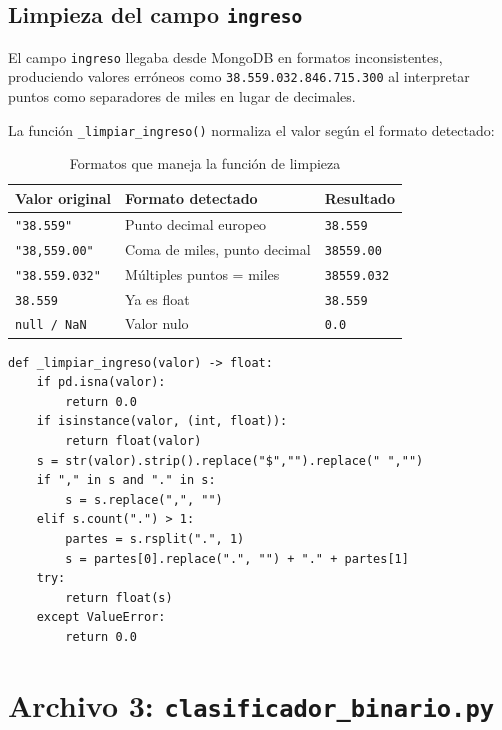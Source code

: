 \documentclass[12pt,a4paper]{article}
\begin{document}
\subsection{Limpieza del campo \texttt{ingreso}}

El campo \texttt{ingreso} llegaba desde MongoDB en formatos inconsistentes,
produciendo valores err\'oneos como \texttt{38.559.032.846.715.300} al
interpretar puntos como separadores de miles en lugar de decimales.

La funci\'on \texttt{\_limpiar\_ingreso()} normaliza el valor seg\'un el
formato detectado:

\begin{table}[H]
  \centering
  \caption{Formatos que maneja la funci\'on de limpieza}
  \begin{tabular}{lll}
    \toprule
    \textbf{Valor original} & \textbf{Formato detectado}      & \textbf{Resultado} \\
    \midrule
    \texttt{"38.559"}       & Punto decimal europeo           & \texttt{38.559} \\
    \texttt{"38,559.00"}    & Coma de miles, punto decimal    & \texttt{38559.00} \\
    \texttt{"38.559.032"}   & M\'ultiples puntos = miles      & \texttt{38559.032} \\
    \texttt{38.559}         & Ya es float                     & \texttt{38.559} \\
    \texttt{null / NaN}     & Valor nulo                      & \texttt{0.0} \\
    \bottomrule
  \end{tabular}
\end{table}

\begin{lstlisting}[caption={L\'ogica de limpieza de ingreso}]
def _limpiar_ingreso(valor) -> float:
    if pd.isna(valor):
        return 0.0
    if isinstance(valor, (int, float)):
        return float(valor)
    s = str(valor).strip().replace("$","").replace(" ","")
    if "," in s and "." in s:
        s = s.replace(",", "")
    elif s.count(".") > 1:
        partes = s.rsplit(".", 1)
        s = partes[0].replace(".", "") + "." + partes[1]
    try:
        return float(s)
    except ValueError:
        return 0.0
\end{lstlisting}

\section{Archivo 3: \texttt{clasificador\_binario.py}}
\end{document}
